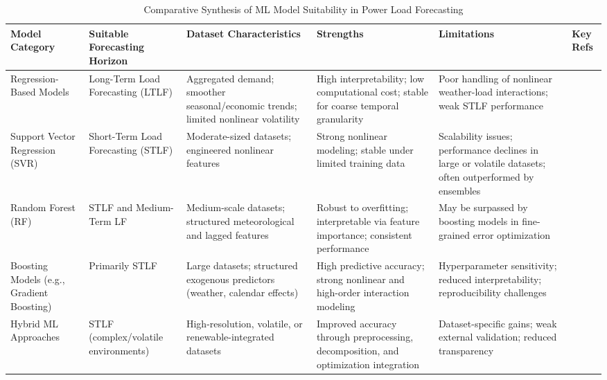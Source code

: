 \documentclass[conference]{IEEEtran}
\begin{document}
\begin{table}[!htbp]
\caption{Comparative Synthesis of ML Model Suitability in Power Load Forecasting}
\label{tab:model_synthesis}
\centering
\renewcommand{\arraystretch}{1.2}
\begin{tabular}{|p{2.5cm}|p{2.2cm}|p{3.2cm}|p{3cm}|p{3cm}|p{1.5cm}|}
\hline
\textbf{Model Category} &
\textbf{Suitable Forecasting Horizon} &
\textbf{Dataset Characteristics} &
\textbf{Strengths} &
\textbf{Limitations} &
\textbf{Key Refs} \\
\hline

Regression-Based Models &
Long-Term Load Forecasting (LTLF) &
Aggregated demand; smoother seasonal/economic trends; limited nonlinear volatility &
High interpretability; low computational cost; stable for coarse temporal granularity &
Poor handling of nonlinear weather-load interactions; weak STLF performance &
\cite{zhang2021,wazirali2023} \\
\hline

Support Vector Regression (SVR) &
Short-Term Load Forecasting (STLF) &
Moderate-sized datasets; engineered nonlinear features &
Strong nonlinear modeling; stable under limited training data &
Scalability issues; performance declines in large or volatile datasets; often outperformed by ensembles &
\cite{azeem2021,zhang2021} \\
\hline

Random Forest (RF) &
STLF and Medium-Term LF &
Medium-scale datasets; structured meteorological and lagged features &
Robust to overfitting; interpretable via feature importance; consistent performance &
May be surpassed by boosting models in fine-grained error optimization &
\cite{vivas2020,zhang2021} \\
\hline

Boosting Models (e.g., Gradient Boosting) &
Primarily STLF &
Large datasets; structured exogenous predictors (weather, calendar effects) &
High predictive accuracy; strong nonlinear and high-order interaction modeling &
Hyperparameter sensitivity; reduced interpretability; reproducibility challenges &
\cite{habbak2023,wazirali2023} \\
\hline

Hybrid ML Approaches & 
STLF (complex/volatile environments) &
High-resolution, volatile, or renewable-integrated datasets &
Improved accuracy through preprocessing, decomposition, and optimization integration &
Dataset-specific gains; weak external validation; reduced transparency &
\cite{vivas2020,azeem2021} \\
\hline

\end{tabular}
\end{table}
\end{document}
